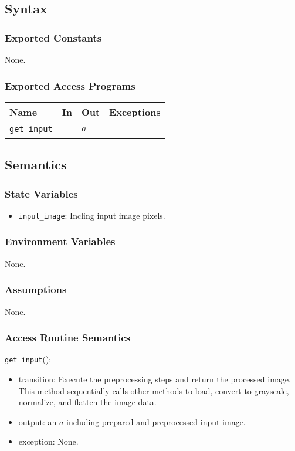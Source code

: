 \documentclass[12pt, titlepage]{article}
\def\code#1{\texttt{#1}}
\begin{document}
\subsection{Syntax}
\subsubsection{Exported Constants}
None.

\subsubsection{Exported Access Programs}

\begin{center}
\begin{tabular}{p{3.5cm} p{4cm} p{4cm} p{2cm}}
\hline
\textbf{Name} & \textbf{In} & \textbf{Out} & \textbf{Exceptions} \\
\hline
\code{get\_input} & - & $a$ & - \\
\hline
\end{tabular}
\end{center}

\subsection{Semantics}

\subsubsection{State Variables}
\begin{itemize}
  \item \code{input\_image}: Incling input image pixels.
\end{itemize}

\subsubsection{Environment Variables}
None.

\subsubsection{Assumptions}
None.

\subsubsection{Access Routine Semantics}

\noindent \code{get\_input}():
\begin{itemize}
  \item transition: Execute the preprocessing steps and return the processed image.
  This method sequentially calls other methods to load, convert to grayscale, 
  normalize, and flatten the image data.
  \item output: an $a$ including prepared and preprocessed input image.
  \item exception: None.
\end{itemize}
\end{document}
